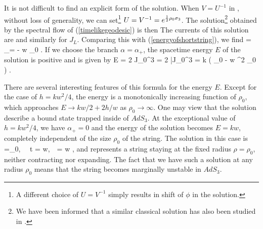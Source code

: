 It is not difficult to find an explicit form of the solution. 
When $V = U^{-1}$ in \timelikegeodesic , without loss of generality,
we can set\footnote{A different choice of
$U = V^{-1}$ simply results in shift of $\phi$ in the solution.} 
$U=V^{-1}= e^{{1\over 2}\rho_0\sigma_3}$. The 
solution\footnote{We have been informed that a similar
classical solution has also been studied 
in \cite{sanchez1,sanchez2}.}
 obtained by the spectral flow of 
(\ref{timelikegeodesic}) is then
 {}
The currents of this solution are
{}
and similarly for $J_L$.
Comparing this with (\ref{energyofshortstring}), we find 
{ \alpha = \alpha_\pm = - w \cosh \rho_0 \pm
{}.}
If we choose the branch $\alpha = \alpha_+$,
the spacetime energy $E$ of the solution is
positive and is given by 
{ E = 2 J_0^3 = 2 \bar{J}_0^3 = k \left(
\cosh \rho_0   - 
w \sinh^2 \rho_0 \right) .}

There are several interesting features of this formula
for the energy $E$. Except for the case of $h = kw^2/4$, the
energy is a monotonically increasing function of
$\rho_0$, which approaches 
$E \rightarrow kw/2 + 2h/w$ as $\rho_0 \rightarrow \infty$. 
One may view that the solution describe a bound state
trapped inside of $AdS_3$. 
At the exceptional value of $h=k w^2/4$, we have $\alpha_+=0$ 
and the energy of the solution becomes $E = k w$,
completely independent of the size $\rho_0$ of the string.
The solution in this case is 
{ \rho=\rho_0,  ~~t = w\tau,~~\phi = w \sigma, }
and represents a string staying at the fixed radius $\rho= \rho_0$,
neither contracting nor expanding. 
The fact that we have such a solution at any radius $\rho_0$
means that the string becomes marginally unstable in $AdS_3$. 

